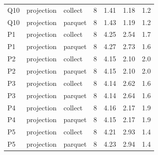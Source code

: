 \begin{tabular}{lllrrrr}
Q10 & projection & collect & 8 & 1.41 & 1.18 & 1.2 \\
Q10 & projection & parquet & 8 & 1.43 & 1.19 & 1.2 \\
P1 & projection & collect & 8 & 4.25 & 2.54 & 1.7 \\
P1 & projection & parquet & 8 & 4.27 & 2.73 & 1.6 \\
P2 & projection & collect & 8 & 4.15 & 2.10 & 2.0 \\
P2 & projection & parquet & 8 & 4.15 & 2.10 & 2.0 \\
P3 & projection & collect & 8 & 4.14 & 2.62 & 1.6 \\
P3 & projection & parquet & 8 & 4.14 & 2.64 & 1.6 \\
P4 & projection & collect & 8 & 4.16 & 2.17 & 1.9 \\
P4 & projection & parquet & 8 & 4.15 & 2.17 & 1.9 \\
P5 & projection & collect & 8 & 4.21 & 2.93 & 1.4 \\
P5 & projection & parquet & 8 & 4.23 & 2.94 & 1.4 \\
\bottomrule
\end{tabular}
